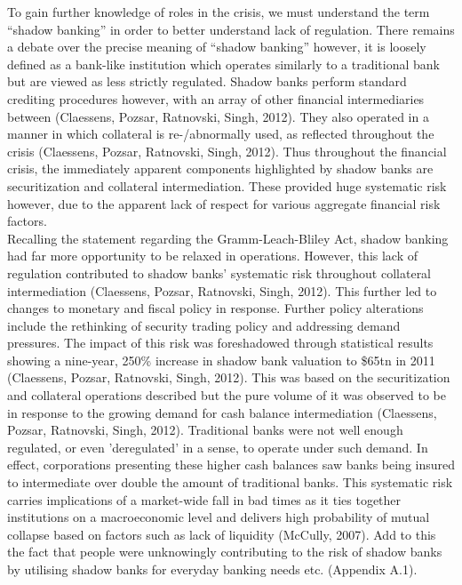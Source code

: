 \documentclass[11pt, english]{article}
\begin{document}
	To gain further knowledge of roles in the crisis, we must understand the term ``shadow banking'' in order to better understand lack of regulation. There remains a debate over the precise meaning of ``shadow banking'' however, it is loosely defined as a bank-like institution which operates similarly to a traditional bank but are viewed as less strictly regulated. Shadow banks perform standard crediting procedures  however, with an array of other financial intermediaries between (Claessens, Pozsar, Ratnovski, Singh, 2012). They also operated in a manner in which collateral is re-/abnormally used, as reflected throughout the crisis (Claessens, Pozsar, Ratnovski, Singh, 2012). Thus throughout the financial crisis, the immediately apparent components highlighted by shadow banks are securitization and collateral intermediation. These provided huge systematic risk however, due to the apparent lack of respect for various aggregate financial risk factors.\\

	Recalling the statement regarding the Gramm-Leach-Bliley Act, shadow banking had far more opportunity to be relaxed in operations. However, this lack of regulation contributed to shadow banks' systematic risk throughout collateral intermediation (Claessens, Pozsar, Ratnovski, Singh, 2012). This further led to changes to monetary and fiscal policy in response. Further policy alterations include the rethinking of security trading policy and addressing demand pressures. The impact of this risk was foreshadowed through statistical results showing a nine-year, 250\% increase in shadow bank valuation to \$65tn in 2011 (Claessens, Pozsar, Ratnovski, Singh, 2012). This was based on the securitization and collateral operations described but the pure volume of it was observed to be in response to the growing demand for cash balance intermediation (Claessens, Pozsar, Ratnovski, Singh, 2012). Traditional banks were not well enough regulated, or even 'deregulated' in a sense, to operate under such demand. In effect, corporations presenting these higher cash balances saw banks being insured to intermediate over double the amount of traditional banks. This systematic risk carries implications of a market-wide fall in bad times as it ties together institutions on a macroeconomic level and delivers high probability of mutual collapse based on factors such as lack of liquidity (McCully, 2007). Add to this the fact that people were unknowingly contributing to the risk of shadow banks by utilising shadow banks for everyday banking needs etc. (Appendix A.1).\\
\end{document}
